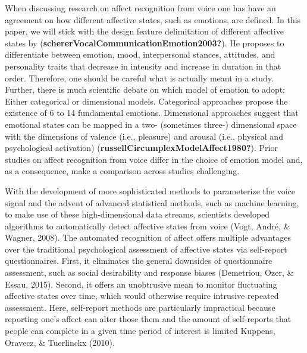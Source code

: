 \documentclass[
  english,
  man,floatsintext]{apa6}
\begin{document}
When discussing research on affect recognition from voice one has have an agreement on how different affective states, such as emotions, are defined. In this paper, we will stick with the design feature delimitation of different affective states by (\textbf{schererVocalCommunicationEmotion2003?}). He proposes to differentiate between emotion, mood, interpersonal stances, attitudes, and personality traits that decrease in intensity and increase in duration in that order.
Therefore, one should be careful what is actually meant in a study. Further, there is much scientific debate on which model of emotion to adopt: Either categorical or dimensional models. Categorical approaches propose the existence of 6 to 14 fundamental emotions. Dimensional approaches suggest that emotional states can be mapped in a two- (sometimes three-) dimensional space with the dimensions of valence (i.e., pleasure) and arousal (i.e., physical and psychological activation) (\textbf{russellCircumplexModelAffect1980?}). Prior studies on affect recognition from voice differ in the choice of emotion model and, as a consequence, make a comparison across studies challenging.

With the development of more sophisticated methods to parameterize the voice signal and the advent of advanced statistical methods, such as machine learning, to make use of these high-dimensional data streams, scientists developed algorithms to automatically detect affective states from voice (Vogt, André, \& Wagner, 2008). The automated recognition of affect offers multiple advantages over the traditional psychological assessment of affective states via self-report questionnaires. First, it eliminates the general downsides of questionnaire assessment, such as social desirability and response biases (Demetriou, Ozer, \& Essau, 2015). Second, it offers an unobtrusive mean to monitor fluctuating affective states over time, which would otherwise require intrusive repeated assessment. Here, self-report methods are particularly impractical because reporting one's affect can alter those them and the amount of self-reports that people can complete in a given time period of interest is limited Kuppens, Oravecz, \& Tuerlinckx (2010).
\end{document}
